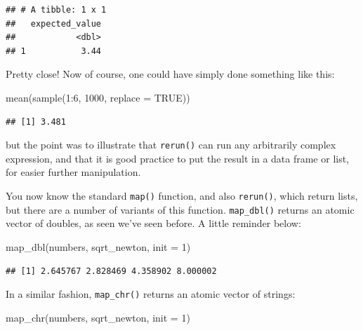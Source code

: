 \documentclass[
]{article}
\newenvironment{Shaded}{\begin{snugshade}}{\end{snugshade}}
\newcommand{\AttributeTok}[1]{\textcolor[rgb]{0.77,0.63,0.00}{#1}}
\newcommand{\ConstantTok}[1]{\textcolor[rgb]{0.00,0.00,0.00}{#1}}
\newcommand{\DecValTok}[1]{\textcolor[rgb]{0.00,0.00,0.81}{#1}}
\newcommand{\FunctionTok}[1]{\textcolor[rgb]{0.00,0.00,0.00}{#1}}
\newcommand{\NormalTok}[1]{#1}
\newcommand{\SpecialCharTok}[1]{\textcolor[rgb]{0.00,0.00,0.00}{#1}}
\begin{document}
\begin{verbatim}
## # A tibble: 1 x 1
##   expected_value
##            <dbl>
## 1           3.44
\end{verbatim}

Pretty close! Now of course, one could have simply done something like this:

\begin{Shaded}
\begin{Highlighting}[]
\FunctionTok{mean}\NormalTok{(}\FunctionTok{sample}\NormalTok{(}\DecValTok{1}\SpecialCharTok{:}\DecValTok{6}\NormalTok{, }\DecValTok{1000}\NormalTok{, }\AttributeTok{replace =} \ConstantTok{TRUE}\NormalTok{))}
\end{Highlighting}
\end{Shaded}

\begin{verbatim}
## [1] 3.481
\end{verbatim}

but the point was to illustrate that \texttt{rerun()} can run any arbitrarily complex expression, and that it is good
practice to put the result in a data frame or list, for easier further manipulation.

You now know the standard \texttt{map()} function, and also \texttt{rerun()}, which return lists, but there are a
number of variants of this function. \texttt{map\_dbl()} returns an atomic vector of doubles, as seen
we've seen before. A little reminder below:

\begin{Shaded}
\begin{Highlighting}[]
\FunctionTok{map\_dbl}\NormalTok{(numbers, sqrt\_newton, }\AttributeTok{init =} \DecValTok{1}\NormalTok{)}
\end{Highlighting}
\end{Shaded}

\begin{verbatim}
## [1] 2.645767 2.828469 4.358902 8.000002
\end{verbatim}

In a similar fashion, \texttt{map\_chr()} returns an atomic vector of strings:

\begin{Shaded}
\begin{Highlighting}[]
\FunctionTok{map\_chr}\NormalTok{(numbers, sqrt\_newton, }\AttributeTok{init =} \DecValTok{1}\NormalTok{)}
\end{Highlighting}
\end{Shaded}
\end{document}
